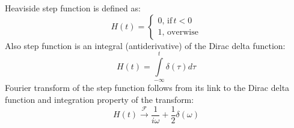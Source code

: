 \documentclass{article}
\begin{document}
Heaviside step function is defined as:
\begin{equation*}
    H(t) = \begin{cases}
        0, \, \text{if} \, t<0 \\
        1, \, \text{overwise}
    \end{cases} 
\end{equation*}
Also step function is an integral (antiderivative) of the Dirac delta function:
\begin{equation*}
    H(t) = \int \limits^{t}_{-\infty} \delta (\tau) d\tau
\end{equation*}
Fourier transform of the step function follows from its link 
to the Dirac delta function and integration property of the transform:
\begin{equation*}
    H(t)  \xrightarrow{\mathcal{F}} \frac{1}{i\omega } + \frac{1}{2} \delta (\omega)
\end{equation*}
\end{document}
